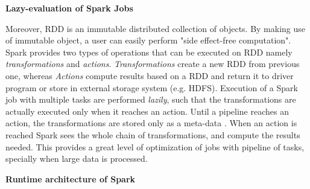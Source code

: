 \textbf{Lazy-evaluation of Spark Jobs} 

Moreover, RDD is an immutable distributed collection of objects. By making use of immutable object, a user can easily perform "side effect-free computation". Spark provides two types of operations that can be executed on RDD namely \textit{transformations} and \textit{actions}. \textit{Transformations} create a new RDD from previous one, whereas \textit{Actions} compute results based on a RDD and return it to driver program or store in external storage system (e.g. HDFS). Execution of a Spark job with multiple tasks are performed \textit{lazily}, such that the transformations are actually executed only when it reaches an action. Until a pipeline reaches an action, the transformations are stored only as a meta-data \cite{learnspark}. When an action is reached Spark sees the whole chain of transformations, and compute the results needed. This provides a great level of optimization of jobs with pipeline of tasks, specially when large data is processed. 

\textbf{Runtime architecture of Spark}

